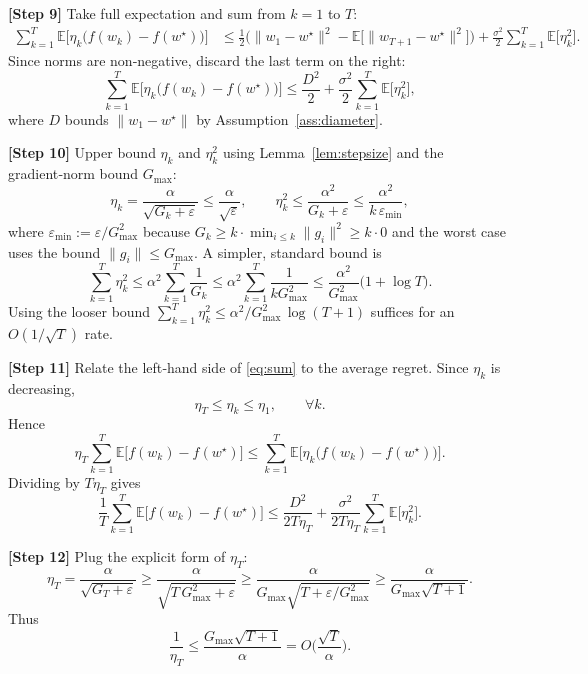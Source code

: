 \documentclass{article}
\newcommand{\E}{\mathbb{E}}
\begin{document}
\noindent\textbf{[Step 9]} Take full expectation and sum from $k=1$ to $T$:
\begin{align}
\sum_{k=1}^{T}\E\!\big[\eta_k\big(f(w_k)-f(w^{\star})\big)\big]
&\le \frac{1}{2}\Big(\|w_1-w^{\star}\|^{2} - \E\!\big[\|w_{T+1}-w^{\star}\|^{2}\big]\Big) +\frac{\sigma^{2}}{2}\sum_{k=1}^{T}\E\!\big[\eta_k^{2}\big]. \label{eq:sum}
\end{align}
Since norms are non‑negative, discard the last term on the right:
\[
\sum_{k=1}^{T}\E\!\big[\eta_k\big(f(w_k)-f(w^{\star})\big)\big]
\le \frac{D^{2}}{2} +\frac{\sigma^{2}}{2}\sum_{k=1}^{T}\E\!\big[\eta_k^{2}\big],
\]
where $D$ bounds $\|w_1-w^{\star}\|$ by Assumption~\ref{ass:diameter}.

\noindent\textbf{[Step 10]} Upper bound $\eta_k$ and $\eta_k^{2}$ using Lemma~\ref{lem:stepsize} and the gradient‑norm bound $G_{\max}$:
\[
\eta_k = \frac{\alpha}{\sqrt{G_k+\varepsilon}} \le \frac{\alpha}{\sqrt{\varepsilon}},\qquad
\eta_k^{2}\le \frac{\alpha^{2}}{G_k+\varepsilon}\le \frac{\alpha^{2}}{k\,\varepsilon_{\min}},
\]
where $\varepsilon_{\min}:=\varepsilon/G_{\max}^{2}$ because $G_k\ge k\cdot \min_{i\le k}\|g_i\|^{2}\ge k\cdot 0$ and the worst case uses the bound $\|g_i\|\le G_{\max}$. A simpler, standard bound is
\[
\sum_{k=1}^{T}\eta_k^{2}
\le \alpha^{2}\sum_{k=1}^{T}\frac{1}{G_k}
\le \alpha^{2}\sum_{k=1}^{T}\frac{1}{k G_{\max}^{2}}
\le \frac{\alpha^{2}}{G_{\max}^{2}}\big(1+\log T\big).
\]
Using the looser bound $\sum_{k=1}^{T}\eta_k^{2}\le \alpha^{2}/G_{\max}^{2}\,\log(T+1)$ suffices for an $O(1/\sqrt{T})$ rate.

\noindent\textbf{[Step 11]} Relate the left‑hand side of \eqref{eq:sum} to the average regret. Since $\eta_k$ is decreasing,
\[
\eta_T \le \eta_k \le \eta_1,\qquad\forall k.
\]
Hence
\[
\eta_T\sum_{k=1}^{T}\E\!\big[f(w_k)-f(w^{\star})\big]
\le \sum_{k=1}^{T}\E\!\big[\eta_k\big(f(w_k)-f(w^{\star})\big)\big].
\]
Dividing by $T\eta_T$ gives
\begin{equation}
\frac{1}{T}\sum_{k=1}^{T}\E\!\big[f(w_k)-f(w^{\star})\big]
\le \frac{D^{2}}{2T\eta_T}+\frac{\sigma^{2}}{2T\eta_T}\sum_{k=1}^{T}\E\!\big[\eta_k^{2}\big]. \label{eq:avg}
\end{equation}

\noindent\textbf{[Step 12]} Plug the explicit form of $\eta_T$:
\[
\eta_T = \frac{\alpha}{\sqrt{G_T+\varepsilon}} \ge \frac{\alpha}{\sqrt{T\,G_{\max}^{2}+\varepsilon}}
\ge \frac{\alpha}{G_{\max}\sqrt{T+ \varepsilon/G_{\max}^{2}}}
\ge \frac{\alpha}{G_{\max}\sqrt{T+1}} .
\]
Thus
\[
\frac{1}{\eta_T}\le \frac{G_{\max}\sqrt{T+1}}{\alpha}=O\!\big(\frac{\sqrt{T}}{\alpha}\big).
\]
\end{document}
